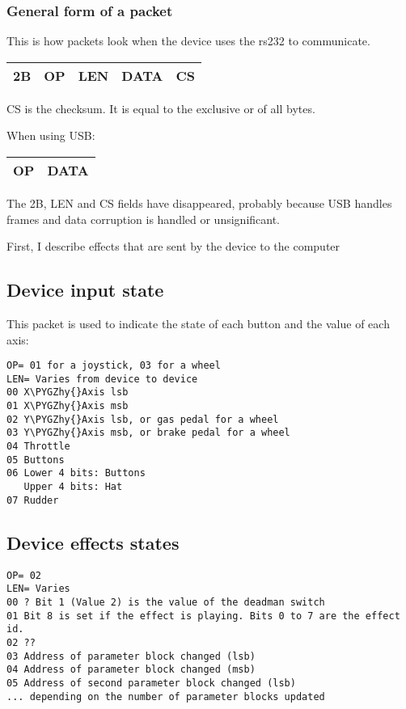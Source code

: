 \documentclass[a4paper,8pt,english]{sphinxmanual}
\def\PYGZhy{\char`\-}
\begin{document}
\subsubsection{General form of a packet}
\label{input/devices/iforce-protocol:general-form-of-a-packet}
This is how packets look when the device uses the rs232 to communicate.

\begin{tabulary}{\linewidth}{|L|L|L|L|L|}
\hline

2B
 & 
OP
 & 
LEN
 & 
DATA
 & 
CS
\\
\hline\end{tabulary}


CS is the checksum. It is equal to the exclusive or of all bytes.

When using USB:

\begin{tabulary}{\linewidth}{|L|L|}
\hline

OP
 & 
DATA
\\
\hline\end{tabulary}


The 2B, LEN and CS fields have disappeared, probably because USB handles
frames and data corruption is handled or unsignificant.

First, I describe effects that are sent by the device to the computer


\subsection{Device input state}
\label{input/devices/iforce-protocol:device-input-state}
This packet is used to indicate the state of each button and the value of each
axis:

\begin{Verbatim}[commandchars=\\\{\}]
OP= 01 for a joystick, 03 for a wheel
LEN= Varies from device to device
00 X\PYGZhy{}Axis lsb
01 X\PYGZhy{}Axis msb
02 Y\PYGZhy{}Axis lsb, or gas pedal for a wheel
03 Y\PYGZhy{}Axis msb, or brake pedal for a wheel
04 Throttle
05 Buttons
06 Lower 4 bits: Buttons
   Upper 4 bits: Hat
07 Rudder
\end{Verbatim}


\subsection{Device effects states}
\label{input/devices/iforce-protocol:device-effects-states}
\begin{Verbatim}[commandchars=\\\{\}]
OP= 02
LEN= Varies
00 ? Bit 1 (Value 2) is the value of the deadman switch
01 Bit 8 is set if the effect is playing. Bits 0 to 7 are the effect id.
02 ??
03 Address of parameter block changed (lsb)
04 Address of parameter block changed (msb)
05 Address of second parameter block changed (lsb)
... depending on the number of parameter blocks updated
\end{Verbatim}
\end{document}
